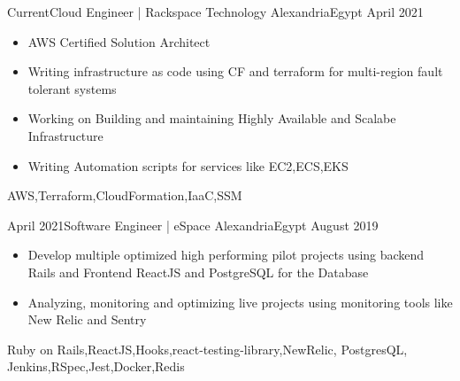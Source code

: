 \begin{experiences}
  \experience
    {Current}{Cloud Engineer | Rackspace Technology }{Alexandria}{Egypt}
    {April 2021}   {
                      \begin{itemize}
                        \item AWS Certified Solution Architect 
                        \item Writing infrastructure as code using CF and terraform for multi-region fault tolerant systems
                        \item  Working on Building and maintaining Highly Available and Scalabe Infrastructure 
                        \item Writing Automation scripts for services like EC2,ECS,EKS
                      \end{itemize}
                    }
                {AWS,Terraform,CloudFormation,IaaC,SSM} 
 \emptySeparator

  \experience
    {April 2021}{Software Engineer | eSpace }{Alexandria}{Egypt}
    {August 2019}   {
                      \begin{itemize}
                        \item  Develop multiple optimized high performing  pilot projects using backend Rails and Frontend ReactJS and PostgreSQL for the Database
                        \item Analyzing, monitoring and optimizing live projects using monitoring tools like New Relic and Sentry
                      \end{itemize}
                    }
                    {Ruby on Rails,ReactJS,Hooks,react-testing-library,NewRelic, PostgresQL, Jenkins,RSpec,Jest,Docker,Redis}                    
\end{experiences}
